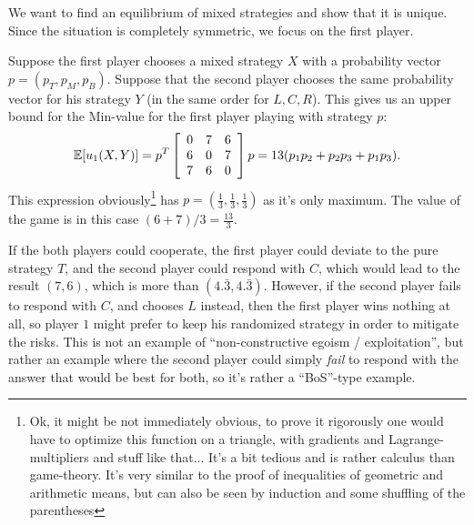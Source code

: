 \documentclass{scrartcl}
\begin{document}
 We want to find an equilibrium of mixed strategies and show 
that it is unique. Since the situation is completely symmetric, we focus on
the first player. 

Suppose the first player chooses a mixed strategy $X$ with a probability 
vector $p = (p_T, p_M, p_B)$. Suppose that the second player chooses the 
same probability vector for his strategy $Y$ (in the same order for $L, C, R$). 
This gives us an
upper bound for the Min-value for the first player playing with strategy $p$:
\[
  \E[u_1(X, Y)] = p^T \mat{ccc}{ 0 & 7 & 6 \\ 6 & 0 & 7 \\ 7 & 6 & 0} p
    = 13(p_1p_2 + p_2p_3 + p_1p_3).
\]
This expression obviously\footnote{Ok, it might be not immediately obvious,
to prove it rigorously one would have to optimize this function on a triangle,
with gradients and Lagrange-multipliers and stuff like that... It's a bit 
tedious and is rather calculus than game-theory. It's very similar to the 
proof of inequalities of geometric and arithmetic means, but can also be seen
by induction and some shuffling of the parentheses} 
has $p = (\frac{1}{3}, \frac{1}{3}, \frac{1}{3})$ as it's only maximum.
The value of the game is in this case $(6 + 7) / 3 = \frac{13}{3}$.

 If the both players could cooperate, 
the first player could deviate to the pure strategy $T$, and the second player
could respond with $C$, which would lead to the result $(7,6)$, which is more
than $(4.\bar 3, 4.\bar 3)$. However, if the second player fails to respond with
$C$, and chooses $L$ instead, then the first player wins nothing at all, so 
player $1$ might prefer to keep his randomized strategy in order to mitigate 
the risks. 
This is not an example of ``non-constructive egoism / exploitation'', 
but rather an example where the second player could simply \emph{fail} to 
respond with the answer that would be best for both, 
so it's rather a ``BoS''-type example.
\end{document}
